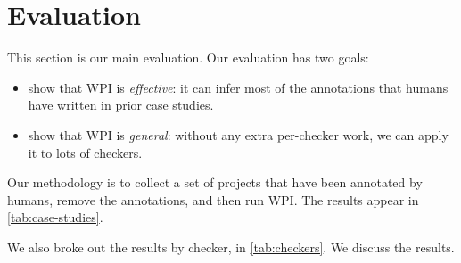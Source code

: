 \section{Evaluation}
\label{sec:evaluation}

This section is our main evaluation. Our evaluation has two goals:
\begin{itemize}
\item show that WPI is \emph{effective}: it can infer most of the
  annotations that humans have written in prior case studies.
\item show that WPI is \emph{general}: without any extra per-checker work,
  we can apply it to lots of checkers.
\end{itemize}



Our methodology is to collect a set of projects that have been annotated
by humans, remove the annotations, and then run WPI.
The results appear in \cref{tab:case-studies}.



We also broke out the results by checker, in \cref{tab:checkers}. We discuss
the results.
